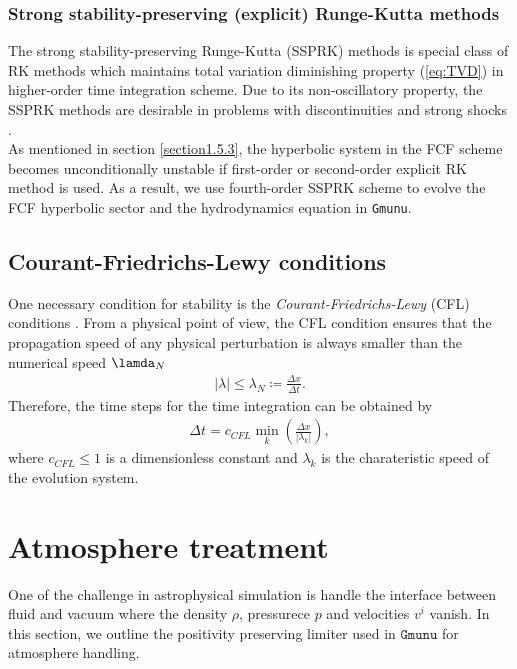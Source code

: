 \subsubsection{Strong stability-preserving (explicit) Runge-Kutta methods}
The strong stability-preserving Runge-Kutta (SSPRK) methods \cite{shu1988total,shu1988efficient}
is special class of RK methods which maintains total variation diminishing property (\ref{eq:TVD})
in higher-order time integration scheme.
Due to its non-oscillatory property,
the SSPRK methods are desirable in problems with discontinuities and strong shocks \cite{hesthaven2007nodal}.\\
As mentioned in section \ref{section1.5.3},
the hyperbolic system in the FCF scheme becomes unconditionally unstable
if first-order or second-order explicit RK method is used.
As a result, we use fourth-order SSPRK scheme to evolve the FCF hyperbolic sector 
and the hydrodynamics equation in \texttt{Gmunu}.

\subsection{Courant-Friedrichs-Lewy conditions}
One necessary condition for stability is the \textit{Courant-Friedrichs-Lewy} (CFL) conditions \cite{courant1928partiellen}.
From a physical point of view,
the CFL condition ensures that the propagation speed of any physical perturbation
is always smaller than the numerical speed $\lamda_N$
\begin{align}
    |\lambda| \leq \lambda_N \coloneqq \frac{\Delta x}{\Delta t}.
\end{align}
Therefore, the time steps for the time integration can be obtained by
\begin{align}
    \Delta t = c_{CFL} \min_k \left(\frac{\Delta x}{|\lambda_k|} \right),
\end{align}
where $c_{CFL}\leq 1$ is a dimensionless constant
and $\lambda_k$ is the charateristic speed of the evolution system.

\section{Atmosphere treatment}
One of the challenge in astrophysical simulation is handle the interface between fluid and vacuum
where the density $\rho$, pressurece $p$ and velocities $v^i$ vanish.
In this section, we outline the positivity preserving limiter \cite{hu2013positivity} used in $\texttt{Gmunu}$
for atmosphere handling.

